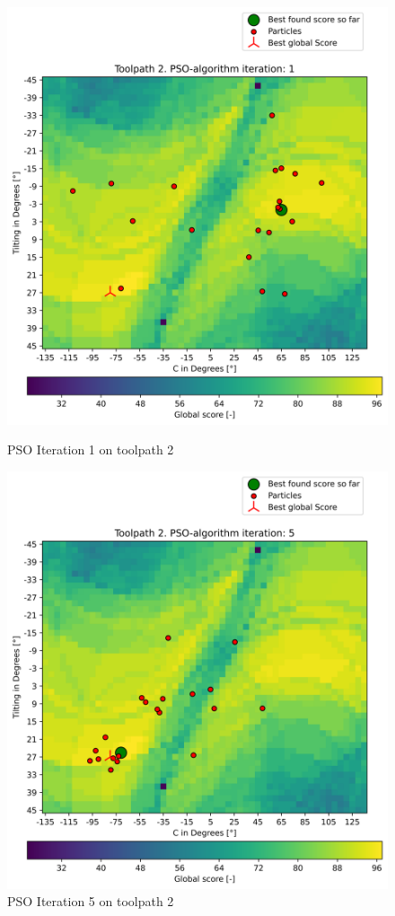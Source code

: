 \begin{figure}[H]	
	\centering
	\begin{minipage}{0.5\textwidth}
		\includegraphics[width=\textwidth]{figures/swarm_true/2_1.png}
		\caption{PSO Iteration 1 on toolpath 2}
		\label{tp2_0}
	\end{minipage}\hfill
	\begin{minipage}{0.5\textwidth}
		\includegraphics[width=\textwidth]{figures/swarm_true/2_5.png}
		\caption{PSO Iteration 5 on toolpath 2}
		\label{tp2_5}
	\end{minipage}\par
\end{figure}
